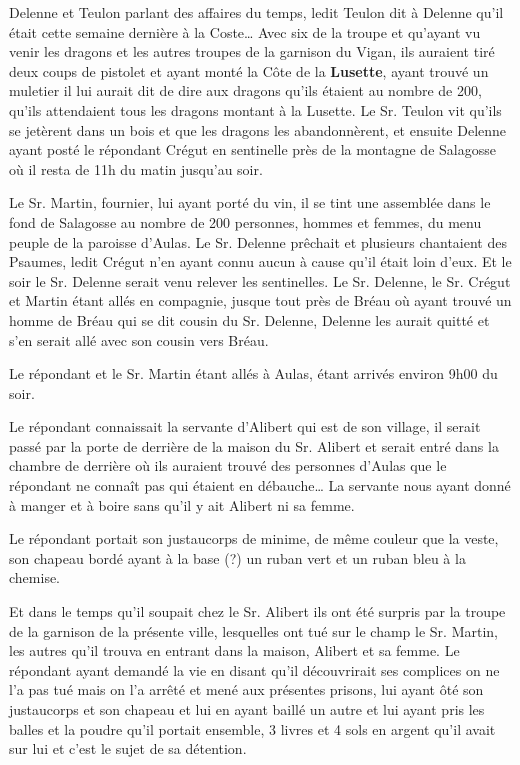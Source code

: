 Delenne et Teulon parlant des affaires du temps, ledit Teulon dit à Delenne qu’il était cette semaine dernière à la Coste… Avec six de la troupe et qu’ayant vu venir les dragons et les autres troupes de la garnison du Vigan, ils auraient tiré deux coups de pistolet et ayant monté la Côte de la \textbf{Lusette}, ayant trouvé un muletier il lui aurait dit de dire aux dragons qu’ils étaient au nombre de 200, qu’ils attendaient tous les dragons montant à la Lusette. Le Sr. Teulon vit qu’ils se jetèrent dans un bois et que les dragons les abandonnèrent, et ensuite Delenne ayant posté le répondant Crégut en sentinelle près de la montagne de Salagosse où il resta de 11h du matin jusqu’au soir.

Le Sr. Martin, fournier, lui ayant porté du vin, il se tint une assemblée dans le fond de Salagosse au nombre de 200 personnes, hommes et femmes, du menu peuple de la paroisse d’Aulas. Le Sr. Delenne prêchait et plusieurs chantaient des Psaumes, ledit Crégut n’en ayant connu aucun à cause qu’il était loin d’eux.
Et le soir le Sr. Delenne serait venu relever les sentinelles. Le Sr. Delenne, le Sr. Crégut et Martin étant allés en compagnie, jusque tout près de Bréau où ayant trouvé un homme de Bréau qui se dit cousin du Sr. Delenne, Delenne les aurait quitté et s’en serait allé avec son cousin vers Bréau.

Le répondant et le Sr. Martin étant allés à Aulas, étant arrivés environ 9h00 du soir.

Le répondant connaissait la servante d’Alibert qui est de son village, il serait passé par la porte de derrière de la maison du Sr. Alibert et serait entré dans la chambre de derrière où ils auraient trouvé des personnes d’Aulas que le répondant ne connaît pas qui étaient en débauche… La servante nous ayant donné à manger et à boire sans qu’il y ait Alibert ni sa femme.

Le répondant portait son justaucorps de minime, de même couleur que la veste, son chapeau bordé ayant à la base (?) un ruban vert et un ruban bleu à la chemise.

Et dans le temps qu’il soupait chez le Sr. Alibert ils ont été surpris par la troupe de la garnison de la présente ville, lesquelles ont tué sur le champ le Sr. Martin, les autres qu’il trouva en entrant dans la maison, Alibert et sa femme. Le répondant ayant demandé la vie en disant qu’il découvrirait ses complices on ne l’a pas tué mais on l’a arrêté et mené aux présentes prisons, lui ayant ôté son justaucorps et son chapeau et lui en ayant baillé un autre et lui ayant pris les balles et la poudre qu’il portait ensemble, 3 livres et 4 sols en argent qu’il avait sur lui et c’est le sujet de sa détention.

